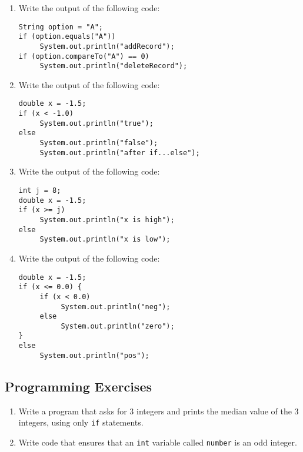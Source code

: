 \begin{enumerate}
\item Write the output of the following code:
\begin{lstlisting}
String option = "A";
if (option.equals("A"))
     System.out.println("addRecord");
if (option.compareTo("A") == 0)
     System.out.println("deleteRecord");
\end{lstlisting}

\item Write the output of the following code:
\begin{lstlisting}
double x = -1.5;
if (x < -1.0)
     System.out.println("true");
else
     System.out.println("false");
     System.out.println("after if...else");
\end{lstlisting}

\item Write the output of the following code:
\begin{lstlisting}
int j = 8;
double x = -1.5;
if (x >= j)
     System.out.println("x is high");
else
     System.out.println("x is low");
\end{lstlisting}

\item Write the output of the following code:
\begin{lstlisting}
double x = -1.5;
if (x <= 0.0) {
     if (x < 0.0)
          System.out.println("neg");
     else
          System.out.println("zero");
}
else
     System.out.println("pos");
\end{lstlisting}

\end{enumerate}

\subsection{Programming Exercises}

\begin{enumerate}

\item Write a program that asks for 3 integers and prints the median value of the 3 integers, using only \verb|if| statements.

\item Write code that ensures that an \verb|int| variable called \verb|number| is an odd integer.

\end{enumerate}